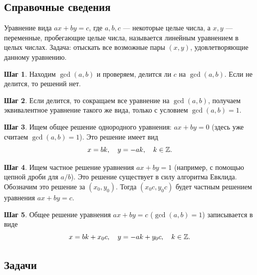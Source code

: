 \subsection*{Справочные сведения}

Уравнение вида $ax+by=c$, где $a,b,c$ --- некоторые целые числа, а $x,y$ --- переменные, пробегающие целые числа, называется линейным уравнением в целых числах. Задача: отыскать все возможные пары $(x,y)$, удовлетворяющие данному уравнению.

\textbf{Шаг 1}. Находим $\gcd(a,b)$ и проверяем, делится ли $c$ на $\gcd(a,b)$. Если не делится, то решений нет.

\textbf{Шаг 2}. Если делится, то сокращаем все уравнение на $\gcd(a,b)$, получаем эквивалентное уравнение такого же вида, только с условием $\gcd(a,b)=1$.

\textbf{Шаг 3}. Ищем общее решение однородного уравнения: $ax+by=0$ (здесь уже считаем $\gcd(a,b)=1$). Это решение имеет вид
$$
x=bk,\quad y=-ak, \quad k\in\mathbb Z.
$$

\textbf{Шаг 4}. Ищем частное решение уравнения $ax+by=1$ (например, с помощью цепной дроби для $a/b$). Это решение существует в силу алгоритма Евклида. Обозначим это решение за $(x_0,y_0)$. Тогда $(x_0c,y_0c)$ будет частным решением уравнения $ax+by=c$.

\textbf{Шаг 5}. Общее решение уравнения $ax+by=c$ ($\gcd(a,b)=1$) записывается в виде 
$$
x=bk+x_0c,\quad y=-ak+y_0c, \quad k\in\mathbb Z.
$$


\subsection*{Задачи}

